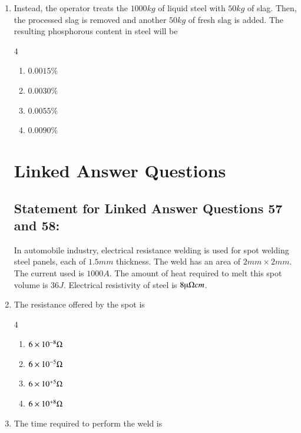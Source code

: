 \documentclass[journal]{IEEEtran}
\theoremstyle{remark}
\begin{document}
\begin{enumerate}
\begin {multicols}{4}
\begin{enumerate}
\item   $0.001 \%$
\item    $0.002\%$
\item  $0.010\%$
\item $0.018\%$
\end{enumerate}
\end{multicols}
\item    Instead, the operator treats the $1000kg$ of liquid steel with $50 kg$ of slag. Then, the processed slag is removed and another $50 kg$ of fresh slag is added. The resulting phosphorous content in steel will be

\hfill{}

\begin {multicols}{4}
\begin{enumerate}
\item   $0.0015\%$
\item   $0.0030\%$
\item   $0.0055\%$
\item $0.0090\%$
\end{enumerate}
\end{multicols}
\section*{Linked Answer Questions}
\subsection*{Statement for Linked Answer Questions 57 and 58:}
In automobile industry, electrical resistance welding is used for spot welding steel panels, each of $1.5 mm$ thickness. The weld has an area of $2 mm \times 2 mm$. The current used is $1000 A$. The amount of heat required to melt this spot volume is $36 J$. Electrical resistivity of steel is $8 \micro \ohm cm$.
\item   The resistance offered by the spot is
\hfill{}

\begin {multicols}{4}
\begin{enumerate}
\item  $6 \times10^{-8} \ohm$
\item   $6 \times10^{-5} \ohm$
\item  $6 \times10^{+5} \ohm$
\item$6 \times10^{+8} \ohm$
\end{enumerate}
\end{multicols}
\item   The time required to perform the weld is
\hfill{}


\end{enumerate}
\end{document}
